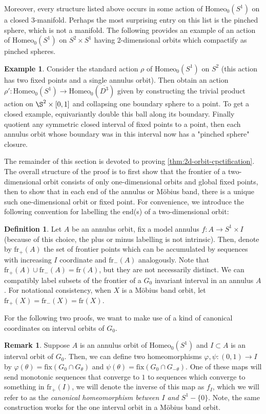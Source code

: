 \documentclass[10pt, oneside]{article}
\newcommand{\homeo}[1][S^1]{\text{Homeo}_0(#1)}
\newcommand{\cl}[1]{\overline{#1}}
\theoremstyle{definition}
\newtheorem{defn}{Definition}[section]
\newtheorem{eg}{Example}[section]
\newtheorem{rem}{Remark}[section]
\theoremstyle{definition}
\begin{document}
Moreover, every structure listed above occurs in some action of $\homeo$ on a closed 3-manifold. Perhaps the most surprising entry on this list is the pinched sphere, which is not a manifold. The following provides an example of an action of $\homeo$ on $S^2 \times S^1$ having 2-dimensional orbits which compactify as pinched spheres.

\begin{eg}
    Consider the standard action $\rho$ of $\homeo[S^1]$ on $S^2$ (this action has two fixed points and a single annulus orbit). Then obtain an action $\rho':\homeo[S^1]\to \homeo[\cl{D^3}]$ given by constructing the trivial product action on $\S^2\times [0,1]$ and collapsing one boundary sphere to a point. To get a closed example, equivariantly double this ball along its boundary. Finally quotient any symmetric closed interval of fixed points to a point, then each annulus orbit whose boundary was in this interval now has a "pinched sphere" closure.
\end{eg}

The remainder of this section is devoted to proving \cref{thm:2d-orbit-cpctification}. The overall structure of the proof is to first show that the frontier of a two-dimensional orbit consists of only one-dimensional orbits and global fixed points, then to show that in each end of the annulus or M\"{o}bius band, there is a unique such one-dimensional orbit or fixed point. For convenience, we introduce the following convention for labelling the end(s) of a two-dimensional orbit:

\begin{defn}
    Let $A$ be an annulus orbit, fix a model annulus $f:A\to S^1\times I$ (because of this choice, the plus or minus labelling is not intrinsic). Then, denote by $\text{fr}_+(A)$ the set of frontier points which can be accumulated by sequences with increasing $I$ coordinate and $\text{fr}_-(A)$ analogously. Note that $\text{fr}_+(A)\cup\text{fr}_-(A) = \text{fr}(A)$, but they are not necessarily distinct. We can compatibly label subsets of the frontier of a $G_0$ invariant interval in an annulus $A$. For notational consistency, when $X$ is a M\"{o}bius band orbit, let $\text{fr}_+(X) = \text{fr}_-(X) = \text{fr}(X)$.
\end{defn}

For the following two proofs, we want to make use of a kind of canonical coordinates on interval orbits of $G_0$.

\begin{rem}\cite{chen_structure_2023}
    Suppose $A$ is an annulus orbit of $\homeo$ and $I\subset A$ is an interval orbit of $G_0$. Then, we can define two homeomorphisms $\varphi, \psi:(0,1) \to I$ by $\varphi(\theta) = \text{fix}(G_0\cap G_\theta)$ and $\psi(\theta) = \text{fix}(G_0\cap G_{-\theta})$. One of these maps will send monotonic sequences that converge to $1$ to sequences which converge to something in $\text{fr}_+(I)$, we will denote the inverse of this map as $f_I$, which we will refer to as the {\it canonical homeomorphism between $I$ and $S^1 - \{0\}$}. Note, the same construction works for the one interval orbit in a M\"{o}bius band orbit.
\end{rem}
\end{document}

